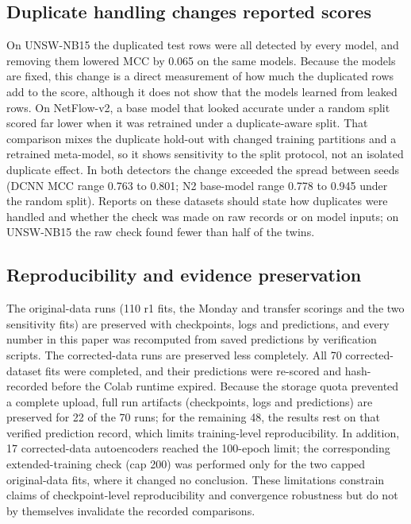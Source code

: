 \documentclass[journal]{IEEEtran}
\begin{document}
\subsection{Duplicate handling changes reported scores}
On UNSW-NB15 the duplicated test rows were all detected by every model, and removing them lowered MCC
by 0.065 on the same models. %
Because the models are fixed, this change is a direct measurement of how much the duplicated rows
add to the score, although it does not show that the models learned from leaked rows. On NetFlow-v2,
a base model that looked accurate under a random split scored far lower when it was retrained under
a duplicate-aware split. That comparison mixes the duplicate hold-out with changed training
partitions and a retrained meta-model, so it shows sensitivity to the split protocol, not an
isolated duplicate effect. In both detectors the change exceeded the spread between seeds (DCNN MCC
range 0.763 to 0.801; N2 base-model range 0.778 to 0.945 under the random split).
Reports on these datasets should state how duplicates were handled and
whether the check was made on raw records or on model inputs; on UNSW-NB15 the raw check found fewer
than half of the twins.

\subsection{Reproducibility and evidence preservation}
\label{sec:repro}
The original-data runs (110 r1 fits, the Monday and transfer scorings and the two sensitivity fits)
are preserved with checkpoints, logs and predictions, and every number in this paper was recomputed
from saved predictions by verification scripts. The corrected-data runs are preserved less
completely. All 70 corrected-dataset fits were completed, and their predictions were re-scored and
hash-recorded before the Colab runtime expired. Because the storage quota prevented a complete
upload, full run artifacts (checkpoints, logs and predictions) are preserved for 22 of the 70 runs;
for the remaining 48, the results rest on that verified prediction record, which limits
training-level reproducibility. In addition, 17 corrected-data autoencoders reached the 100-epoch
limit; the corresponding extended-training check (cap 200) was performed only for the two capped
original-data fits, where it changed no conclusion. These limitations constrain claims of
checkpoint-level reproducibility and convergence robustness but do not by themselves invalidate the
recorded comparisons.
\end{document}
